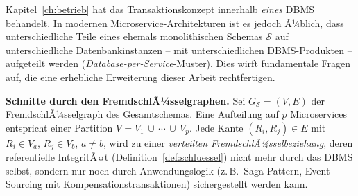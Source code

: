 ﻿\documentclass[a4paper,12pt]{report}
\theoremstyle{definition}
\theoremstyle{remark}
\begin{document}
Kapitel~\ref{ch:betrieb} hat das Transaktionskonzept innerhalb
\emph{eines} DBMS behandelt. In modernen
Microservice-Architekturen ist es jedoch Ã¼blich, dass
unterschiedliche Teile eines ehemals monolithischen Schemas
$\mathcal{S}$ auf unterschiedliche Datenbankinstanzen -- mit
unterschiedlichen DBMS-Produkten -- aufgeteilt werden
(\emph{Database-per-Service}-Muster). Dies wirft fundamentale Fragen
auf, die eine erhebliche Erweiterung dieser Arbeit rechtfertigen.

\textbf{Schnitte durch den FremdschlÃ¼sselgraphen.} Sei
$G_{\mathcal{S}}=(V,E)$ der FremdschlÃ¼sselgraph des
Gesamtschemas. Eine Aufteilung auf $p$ Microservices entspricht einer
Partition $V=V_1\,\dot\cup\,\cdots\,\dot\cup\,V_p$. Jede Kante
$(R_i,R_j)\in E$ mit $R_i\in V_a$, $R_j\in V_b$, $a\neq b$, wird zu
einer \emph{verteilten FremdschlÃ¼sselbeziehung}, deren referentielle
IntegritÃ¤t (Definition~\ref{def:schluessel}) nicht mehr durch das DBMS
selbst, sondern nur noch durch Anwendungslogik (z.\,B.\
Saga-Pattern, Event-Sourcing mit Kompensationstransaktionen)
sichergestellt werden kann.
\end{document}
